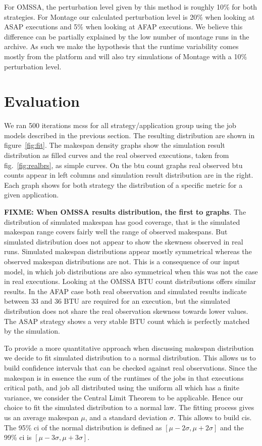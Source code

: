 \documentclass[10pt,conference,compsocconf]{IEEEtran}
\begin{document}
For OMSSA, the perturbation level given by this method is roughly 10\% for both
strategies. For Montage  our calculated perturbation level is  20\% when looking
at ASAP  executions and  5\% when  looking at AFAP  executions. We  believe this
difference can be partially  explained by the low number of  montage runs in the
archive. As such we make the hypothesis that the runtime variability comes
mostly from the platform and will also try simulations of Montage with a 10\%
perturbation level.

\section{Evaluation}
\label{sec:eval}

We ran 500 iterations \acp{mcs} for all strategy/application group using the
job models described in the previous section. The resulting distribution are
shown in figure~\ref{fig:fit}. The makespan density graphs show the simulation
result distribution as filled curves and the real observed executions, taken
from fig.~\ref{fig:realbrs}, as simple curves. On the \ac{btu} count graphs
real observed \ac{btu} counts appear in left columns and simulation result
distribution are in the right. Each graph shows for both strategy the
distribution of a specific metric for a given application.

\textbf{FIXME: When OMSSA results distribution, the first to graphs}. The distribution of
simulated makespan has good coverage, that is the simulated makespan range
covers fairly well the range of observed makespans. But simulated distribution
does not appear to show the skewness observed in real runs. Simulated makespan
distributions appear mostly symmetrical whereas the observed makespan
distributions are not. This is a consequence of our input model, in which job 
distributions are also symmetrical when this was not the case in real
executions. Looking at the OMSSA BTU count distributions offers similar results.
In the AFAP case both real observation and simulated results indicate between 33
and 36 BTU are required for an execution, but the simulated distribution does
not share the real observation skewness towards lower values. The ASAP strategy
shows a very stable BTU count which is perfectly matched by the simulation.

To provide a more quantitative approach when discussing makespan distribution we
decide to fit simulated distribution to a normal distribution. This allows us 
to build confidence intervals that can be checked against real observations.
Since the makespan is in essence the sum of the runtimes of the jobs in that
executions critical path, and job all distributed using the uniform  all which has
a finite variance, we consider the Central Limit Theorem to be applicable. Hence
our choice to fit the simulated distribution to a normal law. The fitting
process gives us an average makespan $\mu{}$, and a standard deviation
$\sigma{}$. This allows to build \acp{ci}. The 95\% \ac{ci} of the normal
distribution is defined as $[\mu{}-2\sigma{},\mu{}+2\sigma{}]$ and the 99\%
\ac{ci} is $[\mu{}-3\sigma{},\mu{}+3\sigma{}]$.
\end{document}
